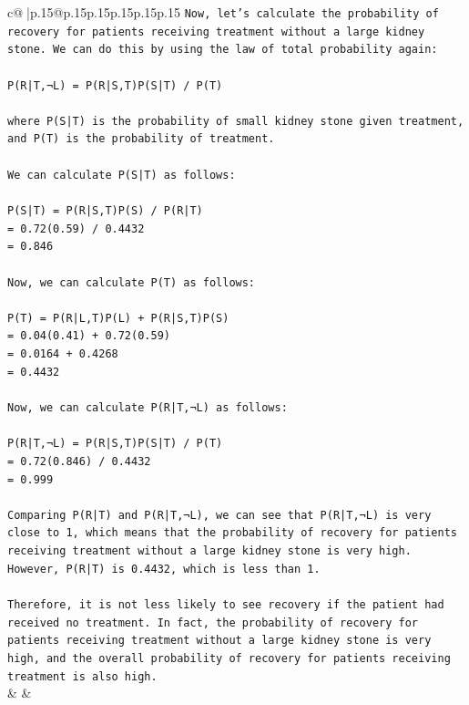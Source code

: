 \documentclass{article}
\begin{document}
{\begin{supertabular}{c@{$\;$}|p{.15\linewidth}@{}p{.15\linewidth}p{.15\linewidth}p{.15\linewidth}p{.15\linewidth}p{.15\linewidth}}
{{{\texttt{Now, let's calculate the probability of recovery for patients receiving treatment without a large kidney stone. We can do this by using the law of total probability again:} \\
\\ 
\texttt{P(R|T,¬L) = P(R|S,T)P(S|T) / P(T)} \\
\\ 
\texttt{where P(S|T) is the probability of small kidney stone given treatment, and P(T) is the probability of treatment.} \\
\\ 
\texttt{We can calculate P(S|T) as follows:} \\
\\ 
\texttt{P(S|T) = P(R|S,T)P(S) / P(R|T)} \\
\texttt{= 0.72(0.59) / 0.4432} \\
\texttt{= 0.846} \\
\\ 
\texttt{Now, we can calculate P(T) as follows:} \\
\\ 
\texttt{P(T) = P(R|L,T)P(L) + P(R|S,T)P(S)} \\
\texttt{= 0.04(0.41) + 0.72(0.59)} \\
\texttt{= 0.0164 + 0.4268} \\
\texttt{= 0.4432} \\
\\ 
\texttt{Now, we can calculate P(R|T,¬L) as follows:} \\
\\ 
\texttt{P(R|T,¬L) = P(R|S,T)P(S|T) / P(T)} \\
\texttt{= 0.72(0.846) / 0.4432} \\
\texttt{= 0.999} \\
\\ 
\texttt{Comparing P(R|T) and P(R|T,¬L), we can see that P(R|T,¬L) is very close to 1, which means that the probability of recovery for patients receiving treatment without a large kidney stone is very high. However, P(R|T) is 0.4432, which is less than 1.} \\
\\ 
\texttt{Therefore, it is not less likely to see recovery if the patient had received no treatment. In fact, the probability of recovery for patients receiving treatment without a large kidney stone is very high, and the overall probability of recovery for patients receiving treatment is also high.} \\
            }
        }
    }
    & & \\ \\


\end{supertabular}}
\end{document}
